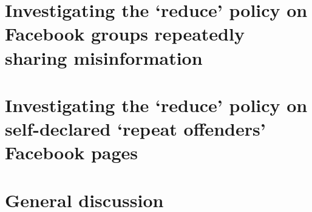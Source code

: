 \documentclass[11pt,a4paper]{article}
\begin{document}
\section{Investigating the `reduce’ policy on Facebook groups repeatedly sharing misinformation}

\section{Investigating the `reduce’ policy on self-declared ‘repeat offenders’ Facebook pages}

\section{General discussion}



\end{document}
